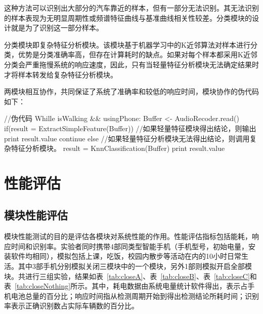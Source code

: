 这种方法可以识别出大部分的汽车靠近的样本，但有一部分无法识别。其无法识别的样本表现为无明显周期性或频谱特征曲线与基准曲线相关性较差。分类模块的设计就是为了识别这一部分样本。

分类模块即复杂特征分析模块。该模块基于机器学习中的K近邻算法对样本进行分类，优势是分类准确率高，但存在计算耗时的缺点。如果对每个样本都采用K近邻分类会严重拖慢系统的响应速度，因此，只有当轻量特征分析模块无法确定结果时才将样本转发给复杂特征分析模块。

两模块相互协作，共同保证了系统了准确率和较低的响应时间，模块协作的伪代码如下：

\begin{code}
//伪代码
Whille isWalking && usingPhone:
    Buffer <- AudioRecoder.read()
    if(result = ExtractSimpleFeature(Buffer))
        //如果轻量特征模块得出结论，则输出
        print result.value
        continue
    else
        //如果轻量特征分析模块无法得出结论，则调用复杂特征分析模块。
        result = KnnClassification(Buffer)
        print result.value

\end{code}



\section{性能评估}

\subsection{模块性能评估}
模块性能测试的目的是评估各模块对系统性能的作用。性能评估指标包括能耗，响应时间和识别率。实验者同时携带4部同类型智能手机（手机型号，初始电量，安装软件均相同），模拟包括上课，吃饭，校园内散步等活动在内的10小时日常生活。其中3部手机分别模拟关闭三模块中的一个模块，另外1部则模拟开启全部模块。共进行三组实验，结果如表~\ref{tab:closeA}、表~\ref{tab:closeB}、表~\ref{tab:closeC}和表~\ref{tab:closeNothing}所示。其中，耗电数据由系统电量统计软件得出，表示占手机电池总量的百分比；响应时间指从检测周期开始到得出检测结论所耗时间；识别率表示正确识别数占实际车辆数的百分比。


